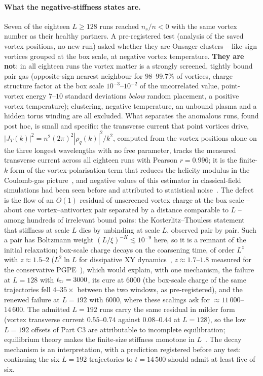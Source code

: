 \documentclass[11pt,a4paper]{article}
\begin{document}
\paragraph{What the negative-stiffness states are.} Seven of the eighteen $L\ge128$ runs reached $n_s/n<0$ with the
same vortex number as their healthy partners. A pre-registered test (analysis of the saved vortex positions, no new
run) asked whether they are Onsager clusters -- like-sign vortices grouped at the box scale, at negative vortex
temperature. \textbf{They are not}: in all eighteen runs the vortex matter is a strongly screened, tightly bound pair
gas (opposite-sign nearest neighbour for $98$--$99.7\%$ of vortices, charge structure factor at the box scale
$10^{-3}$--$10^{-2}$ of the uncorrelated value, point-vortex energy $7$--$10$ standard deviations \emph{below} random
placement, a positive vortex temperature); clustering, negative temperature, an unbound plasma and a hidden torus
winding are all excluded. What separates the anomalous runs, found post hoc, is small and specific: the
transverse current that point vortices drive, $|J_T(k)|^2=n^2(2\pi)^2|\rho_q(k)|^2/k^2$, computed from the vortex
positions alone on the three longest wavelengths with no free parameter, tracks the measured transverse current
across all eighteen runs with Pearson $r=0.996$; it is the finite-$k$ form of the vortex-polarisation term that reduces the helicity modulus in the Coulomb-gas picture~\cite{VallatBeck1994,Faulkner2017}, and negative values of this estimator in classical-field simulations had been seen before and attributed to statistical noise~\cite{Foster2010}. The defect is the flow of an $O(1)$ residual of unscreened vortex
charge at the box scale -- about one vortex--antivortex pair separated by a distance comparable to $L$ -- among
hundreds of irrelevant bound pairs: the Kosterlitz--Thouless statement that stiffness at scale $L$ dies by
unbinding at scale $L$, observed pair by pair. Such a pair has Boltzmann weight $(L/\xi)^{-K}\lesssim10^{-9}$ here,
so it is a remnant of the initial relaxation; box-scale charge decays on the coarsening time, of order $L^z$ with
$z\approx1.5$--$2$ ($L^2\ln L$ for dissipative XY dynamics~\cite{Bray2000}, $z\approx1.7$--$1.8$ measured for the
conservative PGPE~\cite{GroszekBillam2026}), which would explain, with one mechanism, the
failure at $L=128$ with $t_{\rm tr}=3000$, its cure at $6000$ (the box-scale charge of the same trajectories fell
$4$--$35\times$ between the two windows, as pre-registered), and the renewed failure at $L=192$ with $6000$, where
these scalings ask for $\approx11\,000$--$14\,600$. The admitted $L=192$ runs carry the same residual in milder form (vortex
transverse current $0.55$--$0.74$ against $0.08$--$0.44$ at $L=128$), so the low $L=192$ offsets of Part C3 are
attributable to incomplete equilibration; equilibrium theory makes the finite-size stiffness monotone in $L$~\cite{Hasenbusch2005}. The decay mechanism is an interpretation, with a prediction registered
before any test: continuing the six $L=192$ trajectories to $t=14\,500$ should admit at least five of six.
\end{document}
